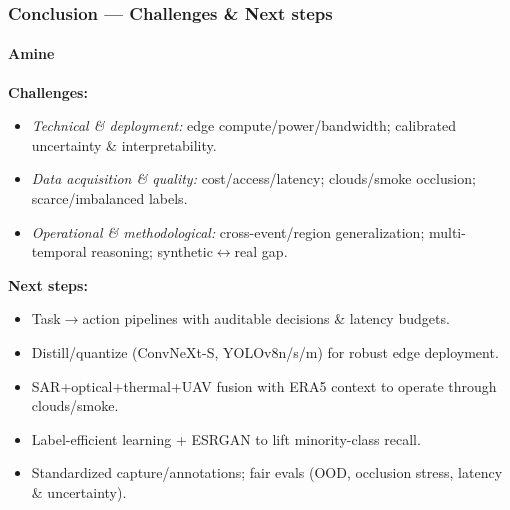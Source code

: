 \documentclass{beamer}
\newcommand{\namedframe}[3]{
  \begin{frame}
    \frametitle{#2}
    \framesubtitle{#1}
    #3
  \end{frame}
}
\begin{document}
\namedframe{Amine}{Conclusion — Challenges \& Next steps}{
\footnotesize
\textbf{Challenges:}
\begin{itemize}
  \item \textit{Technical \& deployment:} edge compute/power/bandwidth; calibrated uncertainty \& interpretability.
  \item \textit{Data acquisition \& quality:} cost/access/latency; clouds/smoke occlusion; scarce/imbalanced labels.
  \item \textit{Operational \& methodological:} cross-event/region generalization; multi-temporal reasoning; synthetic$\leftrightarrow$real gap.
\end{itemize}
\textbf{Next steps:}
\begin{itemize}
  \item Task$\to$action pipelines with auditable decisions \& latency budgets.
  \item Distill/quantize (ConvNeXt-S, YOLOv8n/s/m) for robust edge deployment.
  \item SAR+optical+thermal+UAV fusion with ERA5 context to operate through clouds/smoke.
  \item Label-efficient learning + ESRGAN to lift minority-class recall.
  \item Standardized capture/annotations; fair evals (OOD, occlusion stress, latency \& uncertainty).
\end{itemize}
}
\end{document}
